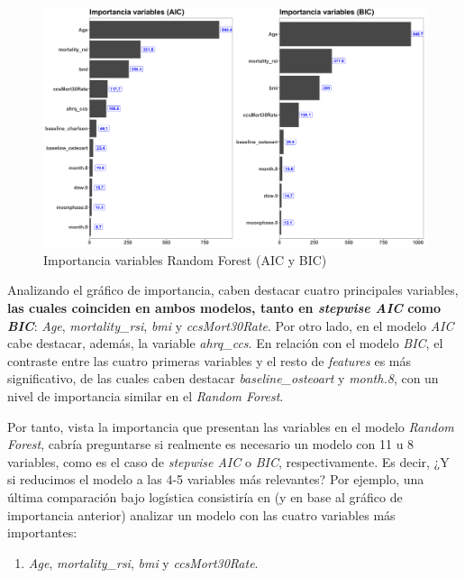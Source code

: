 \documentclass[
]{article}
\providecommand{\tightlist}{%
  \setlength{\itemsep}{0pt}\setlength{\parskip}{0pt}}
\begin{document}
\begin{figure}[h!]

{\centering \includegraphics[width=0.99\linewidth,height=0.99\textheight,]{./charts/01_feature_selection_comparacion_random_forest} 

}

\caption{Importancia variables Random Forest (AIC y BIC)}\label{fig:unnamed-chunk-41}
\end{figure}

Analizando el gráfico de importancia, caben destacar cuatro principales
variables, \textbf{las cuales coinciden en ambos modelos, tanto en
\emph{stepwise AIC} como \emph{BIC}}: \emph{Age}, \emph{mortality\_rsi},
\emph{bmi} y \emph{ccsMort30Rate}. Por otro lado, en el modelo
\emph{AIC} cabe destacar, además, la variable \emph{ahrq\_ccs}. En
relación con el modelo \emph{BIC}, el contraste entre las cuatro
primeras variables y el resto de \emph{features} es más significativo,
de las cuales caben destacar \emph{baseline\_osteoart} y \emph{month.8},
con un nivel de importancia similar en el \emph{Random Forest}.

Por tanto, vista la importancia que presentan las variables en el modelo
\emph{Random Forest}, cabría preguntarse si realmente es necesario un
modelo con 11 u 8 variables, como es el caso de \emph{stepwise AIC} o
\emph{BIC}, respectivamente. Es decir, ¿Y si reducimos el modelo a las
4-5 variables más relevantes? Por ejemplo, una última comparación bajo
logística consistiría en (y en base al gráfico de importancia anterior)
analizar un modelo con las cuatro variables más importantes:

\begin{enumerate}
\def\labelenumi{\arabic{enumi}.}
\tightlist
\item
  \emph{Age}, \emph{mortality\_rsi}, \emph{bmi} y \emph{ccsMort30Rate}.
\end{enumerate}
\end{document}
